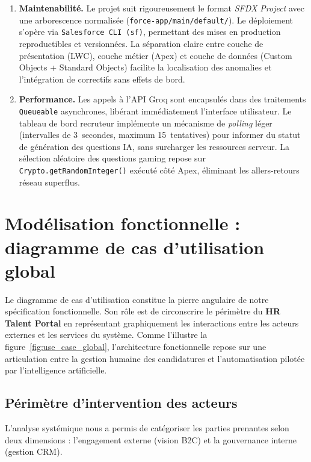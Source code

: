 \begin{enumerate}[label=\textbf{ENF-\arabic*}]
    \item \textbf{Maintenabilité.} Le projet suit rigoureusement le format \textit{SFDX Project} avec une arborescence normalisée (\texttt{force-app/main/default/}). Le déploiement s'opère via \texttt{Salesforce CLI (sf)}, permettant des mises en production reproductibles et versionnées. La séparation claire entre couche de présentation (LWC), couche métier (Apex) et couche de données (Custom Objects + Standard Objects) facilite la localisation des anomalies et l'intégration de correctifs sans effets de bord.

    \item \textbf{Performance.} Les appels à l'API Groq sont encapsulés dans des traitements \texttt{Queueable} asynchrones, libérant immédiatement l'interface utilisateur. Le tableau de bord recruteur implémente un mécanisme de \textit{polling} léger (intervalles de 3~secondes, maximum 15~tentatives) pour informer du statut de génération des questions IA, sans surcharger les ressources serveur. La sélection aléatoire des questions gaming repose sur \texttt{Crypto.getRandomInteger()} exécuté côté Apex, éliminant les allers-retours réseau superflus.
\end{enumerate}

\section{Modélisation fonctionnelle : diagramme de cas d'utilisation global}

Le diagramme de cas d'utilisation constitue la pierre angulaire de notre spécification fonctionnelle. Son rôle est de circonscrire le périmètre du \textbf{HR Talent Portal} en représentant graphiquement les interactions entre les acteurs externes et les services du système. Comme l'illustre la figure~\ref{fig:use_case_global}, l'architecture fonctionnelle repose sur une articulation entre la gestion humaine des candidatures et l'automatisation pilotée par l'intelligence artificielle.

\subsection{Périmètre d'intervention des acteurs}

L'analyse systémique nous a permis de catégoriser les parties prenantes selon deux dimensions : l'engagement externe (vision B2C) et la gouvernance interne (gestion CRM).

